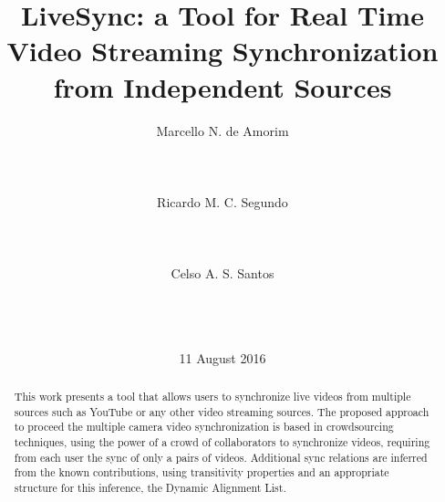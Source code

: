 \documentclass{sig-alternate-05-2015}
\begin{document}





%

\title{LiveSync: a Tool for Real Time Video Streaming Synchronization from Independent Sources}

%
\author{
\alignauthor
		Marcello N. de Amorim\\
       \\
       \\
       \\
\alignauthor
		Ricardo M. C. Segundo\\
       \\
       \\
       \\
\alignauthor 
		Celso A. S. Santos\\
       \\
       \\
       \\
}
\date{11 August 2016}

\maketitle
\begin{abstract}
	This work presents a tool that allows users to synchronize live videos from multiple sources such as YouTube or any other video streaming sources. The proposed approach to proceed the multiple camera video synchronization is based in crowdsourcing techniques, using the power of a crowd of collaborators to synchronize videos, requiring from each user the sync of only a pairs of videos. Additional sync relations are inferred from the known contributions, using transitivity properties and an appropriate structure for this inference, the Dynamic Alignment List.  
\end{abstract}
\end{document}
